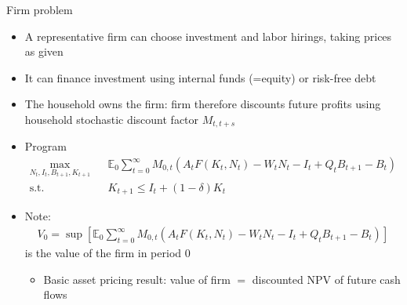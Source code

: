 \documentclass[9pt,xcolor={dvipsnames}]{beamer}
\newcommand{\bit}{\begin{itemize}}
\newcommand{\eit}{\end{itemize}}
\begin{document}
\begin{frame}{Firm problem}

\bit
\setlength\itemsep{1em} 
\item A representative firm can choose investment and labor hirings, taking prices as given

\item It can finance investment using internal funds (=equity) or risk-free debt

\item The household owns the firm: firm therefore discounts future profits using household stochastic discount factor $M_{t,t+s}$

\item Program
\begin{eqnarray}
\max_{N_t, I_t, B_{t+1}, K_{t+1}} && \mathbb E_0 \sum_{t=0}^{\infty} M_{0, t} \left(A_t F(K_t, N_t) - W_t N_t - I_t + Q_tB_{t+1} - B_t \right) \nonumber \\
\text{s.t.} && K_{t+1} \leq I_t + (1-\delta) K_t \nonumber
\end{eqnarray}

\item Note: 
\begin{eqnarray}
V_0 = \sup \left[\mathbb E_0 \sum_{t=0}^{\infty} M_{0, t} \left(A_t F(K_t, N_t) - W_t N_t - I_t + Q_tB_{t+1} - B_t \right)\right] \nonumber
\end{eqnarray}
is the value of the firm in period 0
\bit
	\item Basic asset pricing result: value of firm $=$ discounted NPV of future cash flows
\eit


\eit

\end{frame}
\end{document}
